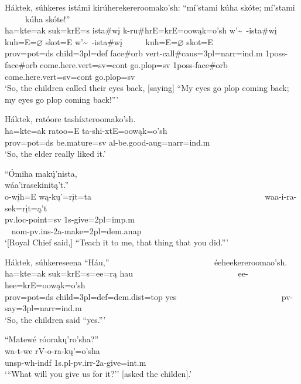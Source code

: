 \begin{exe}
\item\label{EJ19} \glll Háktek, súhkeres istámi kirúherekereroomako'sh: ``mí'stami kúha skóte; mí'stami ~ ~ ~ kúha skóte!''\\
ha=kte=ak suk=krE=s ista\#wį k-ru\#hrE=krE=oowąk=o'sh w'\~~-ista\#wį kuh=E=$\varnothing$ skot=E w'\~~-ista\#wį ~ ~ ~ kuh=E=$\varnothing$ skot=E\\
prov=pot=ds \textnormal{child}=3pl=def \textnormal{face}\#\textnormal{orb} vert-\textnormal{call}\#caus=3pl=narr=ind.m 1poss-\textnormal{face}\#\textnormal{orb} \textnormal{come.here}.vert=sv=cont \textnormal{go.plop}=sv 1poss-\textnormal{face}\#\textnormal{orb} ~ ~ ~ \textnormal{come.here}.vert=sv=cont \textnormal{go.plop}=sv\\
\glt `So, the children called their eyes back, [saying] ``My eyes go plop coming back; my eyes go plop coming back!{''}'

\item\label{EJ20} \glll Háktek, ratóore tashíxteroomako'sh.\\
ha=kte=ak ratoo=E ta-shi-xtE=oowąk=o'sh\\
prov=pot=ds \textnormal{be.mature}=sv al-\textnormal{be.good}-aug=narr=ind.m\\
\glt `So, the elder really liked it.'

\item\label{EJ21} \glll ``Ómiha makų́'nista, ~ ~ ~ ~ ~ ~ ~ ~ ~ ~ ~ ~ ~ ~ ~ ~ ~ ~ ~ ~ ~ ~ ~ ~ ~ wáa'irasekinitą't.''\\
o-wįh=E wą-kų'=rįt=ta ~ ~ ~ ~ ~ ~ ~ ~ ~ ~ ~ ~ ~ ~ ~ ~ ~ ~ ~ ~ ~ ~ ~ ~ ~ waa-i-ra-sek=rįt=ą't\\
pv.loc-\textnormal{point}=sv 1s-\textnormal{give}=2pl=imp.m ~ ~ ~ ~ ~ ~ ~ ~ ~ ~ ~ ~ ~ ~ ~ ~ ~ ~ ~ ~ ~ ~ ~ ~ ~ nom-pv.ins-2a-\textnormal{make}=2pl=dem.anap\\
\glt `[Royal Chief said,] ``Teach it to me, that thing that you did.{''}'

\item\label{EJ22} \glll Háktek, súhkereseena ``Háu,'' ~ ~ ~ ~ ~ ~ ~ ~ ~ ~ ~ ~ ~ ~ ~ éeheekereroomao'sh.\\
ha=kte=ak suk=krE=s=ee=rą hau ~ ~ ~ ~ ~ ~ ~ ~ ~ ~ ~ ~ ~ ~ ~  ee-hee=krE=oowąk=o'sh\\
prov=pot=ds \textnormal{child}=3pl=def=dem.dist=top \textnormal{yes} ~ ~ ~ ~ ~ ~ ~ ~ ~ ~ ~ ~ ~ ~ ~ pv-\textnormal{say}=3pl=narr=ind.m\\
\glt `So, the children said ``yes.{''}'

\item\label{EJ23} \glll ``Matewé róorakų'ro'sha?''\\
wa-t-we rV-o-ra-kų'=o'sha\\
unsp-wh-indf 1s.pl-pv.irr-2a-\textnormal{give}=int.m\\
\glt `{``}What will you give us for it?'' [asked the childen].'


\end{exe}
